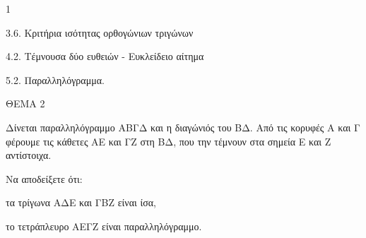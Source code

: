 \begin{ylh}{1}
    \item 3.6. Κριτήρια ισότητας ορθογώνιων τριγώνων
    \item 4.2. Τέμνουσα δύο ευθειών - Ευκλείδειο αίτημα
    \item 5.2. Παραλληλόγραμμα.
\end{ylh}

ΘΕΜΑ 2

Δίνεται παραλληλόγραμμο ΑΒΓΔ και η διαγώνιός του ΒΔ. Από τις κορυφές Α και Γ φέρουμε τις κάθετες ΑΕ και ΓΖ στη ΒΔ, που την τέμνουν στα σημεία Ε και Ζ αντίστοιχα.

Να αποδείξετε ότι:

\begin{alist}
\item τα τρίγωνα ΑΔΕ και ΓΒΖ είναι ίσα, 

\item το τετράπλευρο ΑΕΓΖ είναι παραλληλόγραμμο. 
\end{alist}
